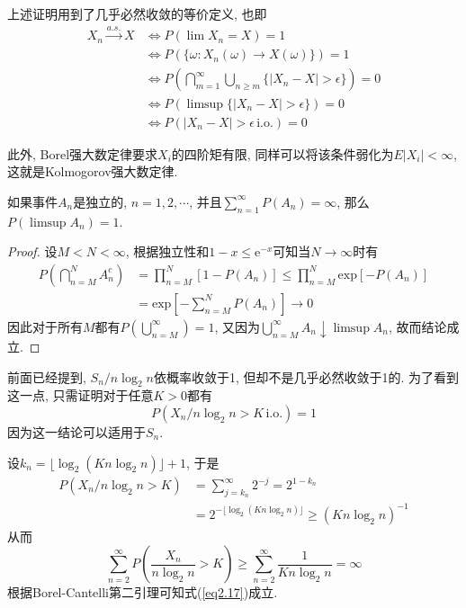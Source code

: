 \documentclass[cn, 12pt, math=mtpro2, bibstyle=apa, blue, twocol]{elegantbook}
\begin{document}
\begin{remark}
上述证明用到了几乎必然收敛的等价定义, 也即
\begin{align*}
X_n\xrightarrow{a.s.}X&\Leftrightarrow P(\lim X_n=X)=1 \\
&\Leftrightarrow P(\{\omega: X_n(\omega) \to X(\omega) \})=1 \\
&\Leftrightarrow \textstyle P(\bigcap_{m=1}^\infty\bigcup_{n\geq m} \{|X_n-X|>\epsilon\})=0 \\
&\Leftrightarrow P(\limsup \{|X_n-X|>\epsilon \})=0 \\
&\Leftrightarrow P(|X_n-X|>\epsilon\,\text{i.o.})=0
\end{align*}

此外, Borel强大数定律要求$X_i$的四阶矩有限, 同样可以将该条件弱化为$E|X_i|<\infty$, 这就是Kolmogorov强大数定律.
\end{remark}
\begin{theorem}
  如果事件$A_n$是独立的, $n=1,2,\cdots$, 并且$\sum_{n=1}^\infty P(A_n)=\infty$, 那么$P(\limsup A_n)=1$.
\end{theorem}
\begin{proof}
  设$M<N<\infty$, 根据独立性和$1-x\leq \text{e}^{-x}$可知当$N\to\infty$时有
  \begin{align*}
  P\left(\bigcap_{n=M}^NA_n^c\right)&=\prod_{n=M}^{N}[1-P(A_n)]\leq \prod_{n=M}^{N}\text{exp}[-P(A_n)] \\
  &=\text{exp}\left[-\sum_{n=M}^{N}P(A_n)\right]\to 0
  \end{align*}
  因此对于所有$M$都有$P(\bigcup_{n=M}^\infty)=1$, 又因为$\bigcup_{n=M}^\infty A_n\downarrow \limsup A_n$, 故而结论成立.
\end{proof}
\begin{example}[圣彼得堡悖论: 续]
前面已经提到, $S_n/n\log_2n$依概率收敛于1, 但却不是几乎必然收敛于1的. 为了看到这一点, 只需证明对于任意$K>0$都有
\begin{equation}\label{eq2.17}
  P(X_n/n\log_2n>K\,\text{i.o.})=1
\end{equation}
因为这一结论可以适用于$S_n$.

设$k_n=\lfloor\log_2(Kn\log_2n)\rfloor+1$, 于是
\begin{align*}
P(X_n/n\log_2n>K)&=\sum_{j=k_n}^{\infty}2^{-j}=2^{1-k_n} \\
&=2^{-\lfloor\log_2(Kn\log_2n)\rfloor}\geq (Kn\log_2n)^{-1}
\end{align*}
从而
$$\sum_{n=2}^{\infty}P\left(\frac{X_n}{n\log_2n}>K\right)\geq \sum_{n=2}^{\infty}\frac{1}{Kn\log_2n}=\infty$$
根据Borel-Cantelli第二引理可知式(\ref{eq2.17})成立.
\end{example}
\end{document}
